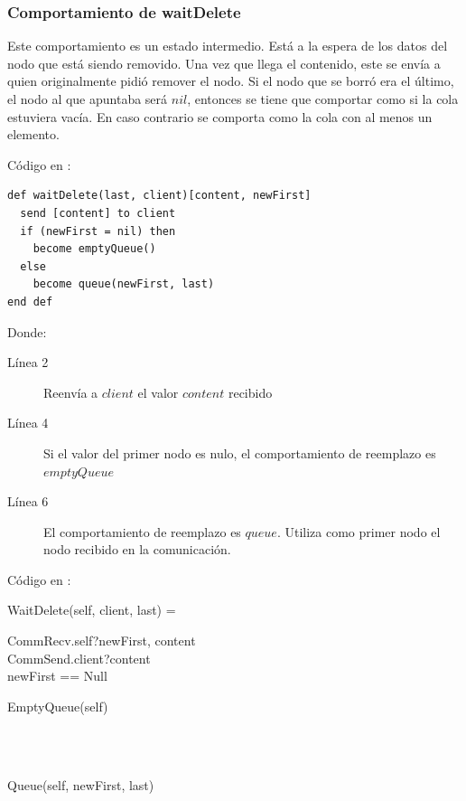 \subsubsection*{Comportamiento de waitDelete}
Este comportamiento es un estado intermedio. Está a la espera de los datos del nodo que está siendo removido. Una vez que llega el contenido, este se envía a quien originalmente pidió remover el nodo. Si el nodo que se borró era el último, el nodo al que apuntaba será $nil$, entonces se tiene que comportar como si la cola estuviera vacía. En caso contrario se comporta como la cola con al menos un elemento.

Código en \SAL:

\begin{lstlisting}[language=sal, style=simple]
def waitDelete(last, client)[content, newFirst]
  send [content] to client
  if (newFirst = nil) then
    become emptyQueue()
  else
    become queue(newFirst, last)
end def
\end{lstlisting}

Donde: 

\begin{description}
 \item [Línea 2] Reenvía a $client$ el valor $content$ recibido
 \item [Línea 4] Si el valor del primer nodo es nulo, el comportamiento de reemplazo es $emptyQueue$
 \item [Línea 6] El comportamiento de reemplazo es $queue$. Utiliza como primer nodo el nodo recibido en la comunicación.
\end{description}

Código en \CSP:

\begin{process}
WaitDelete(self, client, last) = \\ \quad
  \begin{block}
  CommRecv.self?\langle newFirst, content \rangle \then \\ 
  CommSend.client?\langle content \rangle \then \\ 
  \If newFirst == Null \Then \\ \quad
    \begin{block}
      EmptyQueue(self)
    \end{block} \\ 
  \Then \\ \quad
    \begin{block}
    Queue(self, newFirst, last)
    \end{block}
  \end{block} 
\end{process}

